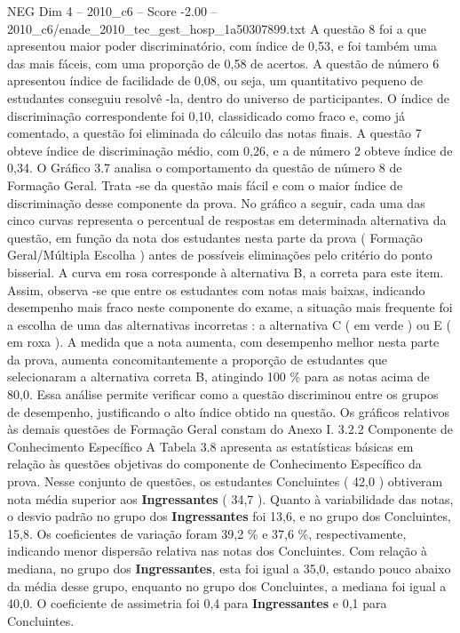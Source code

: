 \begin{textsample}{NEG Dim 4 – 2010\_c6 – Score -2.00 – 2010\_c6/enade\_2010\_tec\_gest\_hosp\_1a50307899.txt}
A questão 8 foi a que apresentou maior poder discriminatório, com índice de 0,53, e foi também uma das mais fáceis, com uma proporção de 0,58 de acertos.
A questão de número 6 apresentou índice de facilidade de 0,08, ou seja, um quantitativo pequeno de estudantes conseguiu resolvê -la, dentro do universo de participantes.
O índice de discriminação correspondente foi 0,10, classidicado como fraco e, como já comentado, a questão foi eliminada do cálcuilo das notas finais.
A questão 7 obteve índice de discriminação médio, com 0,26, e a de número 2 obteve índice de 0,34.
O Gráfico 3.7 analisa o comportamento da questão de número 8 de Formação Geral.
Trata -se da questão mais fácil e com o maior índice de discriminação desse componente da prova.
No gráfico a seguir, cada uma das cinco curvas representa o percentual de respostas em determinada alternativa da questão, em função da nota dos estudantes nesta parte da prova ( Formação Geral/Múltipla Escolha ) antes de possíveis eliminações pelo critério do ponto bisserial.
A curva em rosa corresponde à alternativa B, a correta para este item.
Assim, observa -se que entre os estudantes com notas mais baixas, indicando desempenho mais fraco neste componente do exame, a situação mais frequente foi a escolha de uma das alternativas incorretas : a alternativa C ( em verde ) ou E ( em roxa ).
A medida que a nota aumenta, com desempenho melhor nesta parte da prova, aumenta concomitantemente a proporção de estudantes que selecionaram a alternativa correta B, atingindo 100 \% para as notas acima de 80,0.
Essa análise permite verificar como a questão discriminou entre os grupos de desempenho, justificando o alto índice obtido na questão.
Os gráficos relativos às demais questões de Formação Geral constam do Anexo I. 3.2.2 Componente de Conhecimento Específico A Tabela 3.8 apresenta as estatísticas básicas em relação às questões objetivas do componente de Conhecimento Específico da prova.
Nesse conjunto de questões, os estudantes Concluintes ( 42,0 ) obtiveram nota média superior aos \textbf{Ingressantes} ( 34,7 ).
Quanto à variabilidade das notas, o desvio padrão no grupo dos \textbf{Ingressantes} foi 13,6, e no grupo dos Concluintes, 15,8.
Os coeficientes de variação foram 39,2 \% e 37,6 \%, respectivamente, indicando menor dispersão relativa nas notas dos Concluintes.
Com relação à mediana, no grupo dos \textbf{Ingressantes}, esta foi igual a 35,0, estando pouco abaixo da média desse grupo, enquanto no grupo dos Concluintes, a mediana foi igual a 40,0.
O coeficiente de assimetria foi 0,4 para \textbf{Ingressantes} e 0,1 para Concluintes.

\end{textsample}
